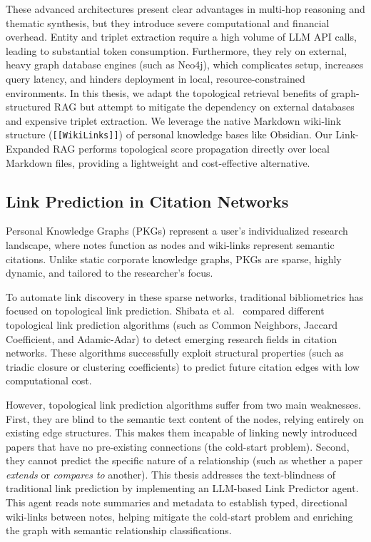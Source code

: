 \documentclass[runningheads]{llncs}
\begin{document}
These advanced architectures present clear advantages in multi-hop reasoning and thematic synthesis, but they introduce severe computational and financial overhead. Entity and triplet extraction require a high volume of LLM API calls, leading to substantial token consumption. Furthermore, they rely on external, heavy graph database engines (such as Neo4j), which complicates setup, increases query latency, and hinders deployment in local, resource-constrained environments. In this thesis, we adapt the topological retrieval benefits of graph-structured RAG but attempt to mitigate the dependency on external databases and expensive triplet extraction. We leverage the native Markdown wiki-link structure (\texttt{[[WikiLinks]]}) of personal knowledge bases like Obsidian. Our Link-Expanded RAG performs topological score propagation directly over local Markdown files, providing a lightweight and cost-effective alternative.

\subsection{Link Prediction in Citation Networks}
Personal Knowledge Graphs (PKGs) represent a user's individualized research landscape, where notes function as nodes and wiki-links represent semantic citations. Unlike static corporate knowledge graphs, PKGs are sparse, highly dynamic, and tailored to the researcher's focus.

To automate link discovery in these sparse networks, traditional bibliometrics has focused on topological link prediction. Shibata et al.~\cite{shibata2012link} compared different topological link prediction algorithms (such as Common Neighbors, Jaccard Coefficient, and Adamic-Adar) to detect emerging research fields in citation networks. These algorithms successfully exploit structural properties (such as triadic closure or clustering coefficients) to predict future citation edges with low computational cost.

However, topological link prediction algorithms suffer from two main weaknesses. First, they are blind to the semantic text content of the nodes, relying entirely on existing edge structures. This makes them incapable of linking newly introduced papers that have no pre-existing connections (the cold-start problem). Second, they cannot predict the specific nature of a relationship (such as whether a paper \textit{extends} or \textit{compares to} another). This thesis addresses the text-blindness of traditional link prediction by implementing an LLM-based Link Predictor agent. This agent reads note summaries and metadata to establish typed, directional wiki-links between notes, helping mitigate the cold-start problem and enriching the graph with semantic relationship classifications.
\end{document}
